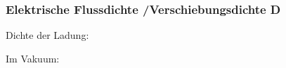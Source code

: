 \subsubsection*{Elektrische Flussdichte /Verschiebungsdichte D}
    \begin{minipage}{0.49\linewidth}
        \begin{center}
            Dichte der Ladung:\\
        \end{center}
    \end{minipage}
    \begin{minipage}{0.49\linewidth}
        \begin{center}
                Im Vakuum:\\
        \end{center}
    \end{minipage}    

        
       